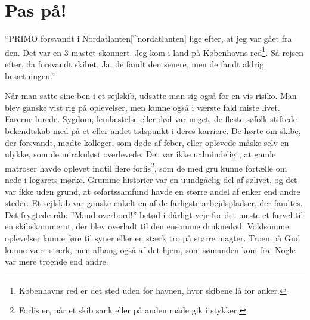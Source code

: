 \chapter{Pas på!}\label{pas-puxe5}

``\textsc{PRIMO} forsvandt i Nordatlanten{[}\^{}nordatlanten{]} lige
efter, at jeg var gået fra den. Det var en 3-mastet skonnert. Jeg kom i
land på Københavns red\footnote{Københavns red er det sted uden for
  havnen, hvor skibene lå for anker.}. Så rejsen efter, da forsvandt
skibet. Ja, de fandt den senere, men de fandt aldrig besætningen.''

Når man satte sine ben i et sejlskib, udsatte man sig også for en vis
risiko. Man blev ganske vist rig på oplevelser, men kunne også i værste
fald miste livet. Farerne lurede. Sygdom, lemlæstelse eller død var
noget, de fleste søfolk stiftede bekendtskab med på et eller andet
tidspunkt i deres karriere. De hørte om skibe, der forsvandt, mødte
kolleger, som døde af feber, eller oplevede måske selv en ulykke, som de
mirakuløst overlevede. Det var ikke ualmindeligt, at gamle matroser
havde oplevet indtil flere forlis\footnote{Forlis er, når et skib sank
  eller på anden måde gik i stykker.}, som de med gru kunne fortælle om
nede i logarets mørke. Grumme historier var en uundgåelig del af
sølivet, og det var ikke uden grund, at søfartssamfund havde en større
andel af enker end andre steder. Et sejlskib var ganske enkelt en af de
farligste arbejdspladser, der fandtes. Det frygtede råb: ''Mand
overbord!'' betød i dårligt vejr for det meste et farvel til en
skibskammerat, der blev overladt til den ensomme druknedød. Voldsomme
oplevelser kunne føre til syner eller en stærk tro på større magter.
Troen på Gud kunne være stærk, men afhang også af det hjem, som sømanden
kom fra. Nogle var mere troende end andre.


